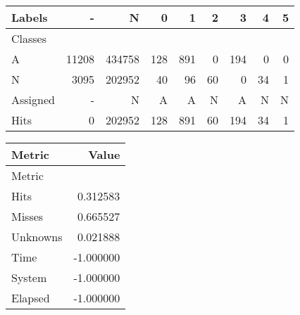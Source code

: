 \begin{tabular}{l|r|r|r|r|r|r|r|r}

Labels &      - &       N &    0 &    1 &   2 &    3 &   4 &  5 \\\hline
Classes  &        &         &      &      &     &      &     &    \\\hline
\hline
A        &  11208 &  434758 &  128 &  891 &   0 &  194 &   0 &  0 \\\hline
N        &   3095 &  202952 &   40 &   96 &  60 &    0 &  34 &  1 \\\hline
\hline
Assigned &      - &       N &    A &    A &   N &    A &   N &  N \\\hline
Hits     &      0 &  202952 &  128 &  891 &  60 &  194 &  34 &  1 
\end{tabular}
\begin{tabular}{l|r}

Metric   &     Value \\\hline
Metric   &           \\\hline
\hline
Hits     &  0.312583 \\\hline
Misses   &  0.665527 \\\hline
Unknowns &  0.021888 \\\hline
Time     & -1.000000 \\\hline
System   & -1.000000 \\\hline
Elapsed  & -1.000000 
\end{tabular}
